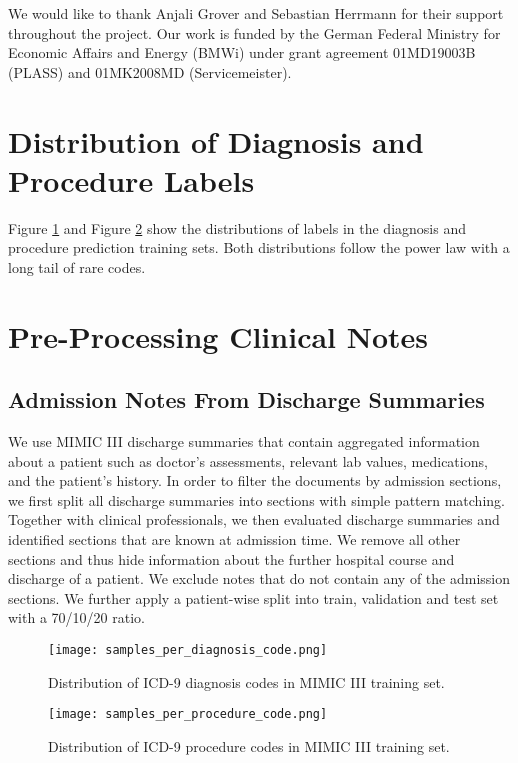 \documentclass[11pt,a4paper]{article}
\begin{document}
We would like to thank Anjali Grover and Sebastian Herrmann for their support throughout the project.
Our work is funded by the German Federal Ministry for Economic Affairs and Energy (BMWi) under grant agreement 01MD19003B (PLASS) and 01MK2008MD (Servicemeister).




\appendix
\section{Distribution of Diagnosis and Procedure Labels}
Figure \ref{fig:dia_dis} and Figure \ref{fig:pro_dis} show the distributions of labels in the diagnosis and procedure prediction training sets. Both distributions follow the power law with a long tail of rare codes.

\section{Pre-Processing Clinical Notes}

\subsection{Admission Notes From Discharge Summaries}
\label{app:filter}
We use MIMIC III discharge summaries that contain aggregated information about a patient such as doctor's assessments, relevant lab values, medications, and the patient's history. 
In order to filter the documents by admission sections, we first split all discharge summaries into sections with simple pattern matching. Together with clinical professionals, we then evaluated discharge summaries and identified sections that are known at admission time. We remove all other sections and thus hide information about the further hospital course and discharge of a patient. We exclude notes that do not contain any of the admission sections.
We further apply a patient-wise split into train, validation and test set with a 70/10/20 ratio. 

\begin{figure}[t]
  \centering
  \texttt{[image: samples\_per\_diagnosis\_code.png]}
  \caption{Distribution of ICD-9 diagnosis codes in MIMIC III training set.}
\label{fig:dia_dis}
\end{figure}

\begin{figure}[t]
  \centering
  \texttt{[image: samples\_per\_procedure\_code.png]}
  \caption{Distribution of ICD-9 procedure codes in MIMIC III training set.}
\label{fig:pro_dis}
\end{figure}
\end{document}
